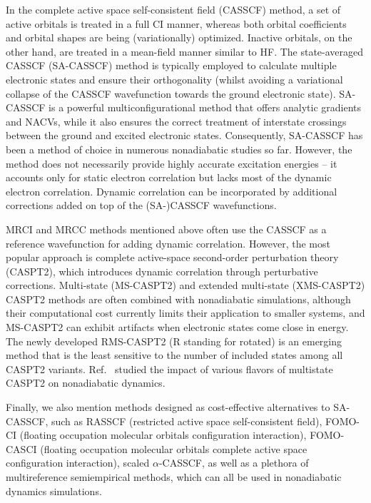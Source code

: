\documentclass[9pt,bestpractices,pubversion]{livecoms}
\begin{document}
In the complete active space self-consistent field (CASSCF) method, a set of active orbitals is treated in a full CI manner, whereas both orbital coefficients and orbital shapes are being (variationally) optimized. Inactive orbitals, on the other hand, are treated in a mean-field manner similar to HF. The state-averaged CASSCF (SA-CASSCF) method is typically employed to calculate multiple electronic states and ensure their orthogonality (whilst avoiding a variational collapse of the CASSCF wavefunction towards the ground electronic state). SA-CASSCF is a powerful multiconfigurational method that offers analytic gradients and NACVs, while it also ensures the correct treatment of interstate crossings between the ground and excited electronic states. Consequently, SA-CASSCF has been a method of choice in numerous nonadiabatic studies so far.\cite{crespo2018recent,gonzalez_quantum_2021,gonzalez2012progress} However, the method does not necessarily provide highly accurate excitation energies -- it accounts only for static electron correlation but lacks most of the dynamic electron correlation. Dynamic correlation can be incorporated by additional corrections added on top of the (SA-)CASSCF wavefunctions.

MRCI and MRCC methods mentioned above often use the CASSCF as a reference wavefunction for adding dynamic correlation.\cite{lischka2018multireference} However, the most popular approach is complete active-space second-order perturbation theory (CASPT2), which introduces dynamic correlation through perturbative corrections. Multi-state (MS-CASPT2) and extended multi-state (XMS-CASPT2) CASPT2 methods are often combined with nonadiabatic simulations, although their computational cost currently limits their application to smaller systems,\cite{park2020multireference} and MS-CASPT2 can exhibit artifacts when electronic states come close in energy.\cite{shiozaki2013pyrazine} The newly developed RMS-CASPT2 (R standing for rotated)\cite{nishimoto2022analytic} is an emerging method that is the least sensitive to the number of included states among all CASPT2 variants.\cite{bezabih2023comparative} Ref.~ studied the impact of various flavors of multistate CASPT2 on nonadiabatic dynamics. 

Finally, we also mention methods designed as cost-effective alternatives to SA-CASSCF, such as RASSCF (restricted active space self-consistent field),\cite{malmqvist1990restricted} FOMO-CI (floating occupation molecular orbitals configuration interaction),\cite{granucci2000molecular,granucci2001direct} FOMO-CASCI (floating occupation molecular orbitals complete active space configuration interaction),\cite{slavicek2010fomocasci,hohenstein2015fomocasci,hollas2017nonadiabatic} scaled $\alpha$-CASSCF,\cite{snyder2017alpha,frutos_tracking_2007} as well as a plethora of multireference semiempirical methods,\cite{thiel2014semiempirical} which can all be used in nonadiabatic dynamics simulations.
\end{document}
